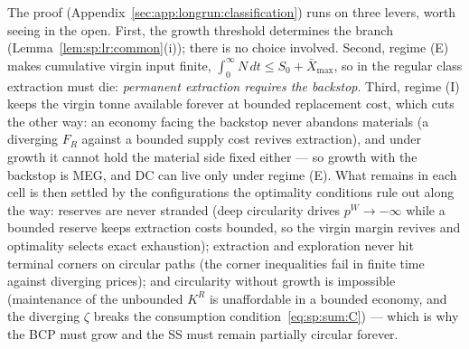 The proof (Appendix~\ref{sec:app:longrun:classification}) runs on three levers, worth seeing in
the open. First, the growth threshold determines the branch (Lemma~\ref{lem:sp:lr:common}(i));
there is no choice involved. Second, regime (E) makes cumulative virgin input finite,
$\int_0^\infty N\,dt\le S_0+\bar X_{\max}$, so in the regular class extraction must die:
\emph{permanent extraction requires the backstop}. Third, regime (I) keeps the virgin tonne
available forever at bounded replacement cost, which cuts the other way: an economy facing the
backstop never abandons materials (a diverging $F_R$ against a bounded supply cost revives
extraction), and under growth it cannot hold the material side fixed either --- so growth with
the backstop is MEG, and DC can live only under regime (E). What remains in each cell is then
settled by the configurations the optimality conditions rule out along the way: reserves are
never stranded (deep circularity drives $p^W\to-\infty$ while a bounded reserve keeps
extraction costs bounded, so the virgin margin revives and optimality selects exact
exhaustion); extraction and exploration never hit terminal corners on circular paths (the
corner inequalities fail in finite time against diverging prices); and circularity without
growth is impossible (maintenance of the unbounded $K^R$ is unaffordable in a bounded economy,
and the diverging $\zeta$ breaks the consumption condition~\eqref{eq:sp:sum:C}) --- which is
why the BCP must grow and the SS must remain partially circular forever.

